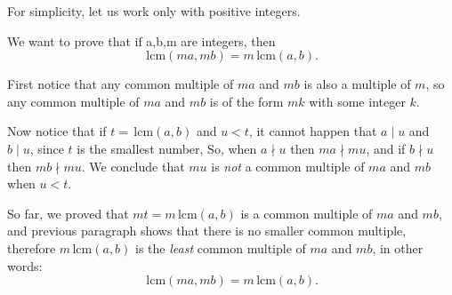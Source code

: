 \documentclass[12pt]{article}
\newcommand{\lcm}{\,\mathrm{lcm}}
\begin{document}
For simplicity, let us work only with positive integers.

We want to prove that if a,b,m are integers, then
\[
\lcm(ma,mb) = m\lcm(a,b).
\]

First notice that any common multiple of $ma$ and $mb$ is also a multiple of $m$, so any common multiple of $ma$ and $mb$ is of the form $mk$ with some integer $k$.

Now notice that if $t=\lcm(a,b)$ and $u<t$, it cannot happen that $a\mid u$ and $b\mid u$, since $t$ is the smallest number, So, when $a\nmid u$ then $ma\nmid mu$, and if $b\nmid u$ then $mb \nmid mu$. We conclude that $mu$ is \emph{not} a common multiple of $ma$ and $mb$ when $u<t$.

So far, we proved that $mt = m\lcm(a,b)$ is a common multiple of $ma$ and $mb$, and previous paragraph shows that there is no smaller common multiple, therefore $m\lcm(a,b)$  is the \emph{least} common multiple of $ma$ and $mb$, in other words:
\[
\lcm(ma,mb) = m\lcm(a,b).
\]
\end{document}
